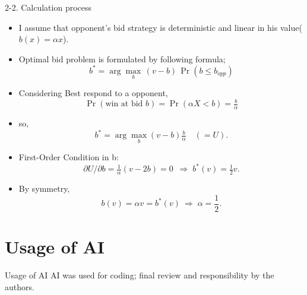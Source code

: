 \documentclass{beamer}
\begin{document}
\begin{frame}{2-2. Calculation process}
\begin{itemize}
    \item I assume that opponent's bid strategy is deterministic and linear in his value($b(x)=\alpha x$).
    \item Optimal bid problem is formulated by following formula;
    \begin{equation*}
        b^{*}=\arg\max_{b}\,(v-b)\,\Pr(b \leq b_{opp})
    \end{equation*}
    \item Considering Best respond to a opponent, 
    \begin{equation*}
        \Pr(\text{win at bid }b)=\Pr(\alpha X<b)=\tfrac{b}{\alpha}
    \end{equation*}
    \item so, 
    \begin{equation*}
        b^{*}=\arg\max_{b}(v-b)\tfrac{b}{\alpha}\quad (= U).
    \end{equation*}
    \item First-Order Condition in b:\\
    \begin{equation*}
    \partial U/\partial b=\tfrac{1}{\alpha}(v-2b)=0 \;\ \Rightarrow\; b^*(v)=\tfrac12 v.
    \end{equation*}
    \item By symmetry, 
    \begin{equation*}
        b(v)=\alpha v=b^*(v) \ \Rightarrow\; \alpha=\frac{1}{2}.
    \end{equation*}
\end{itemize}
\end{frame}

\section{Usage of AI}
\begin{frame}{Usage of AI}
    AI was used for coding; final review and responsibility by the authors.
\end{frame}
\end{document}
